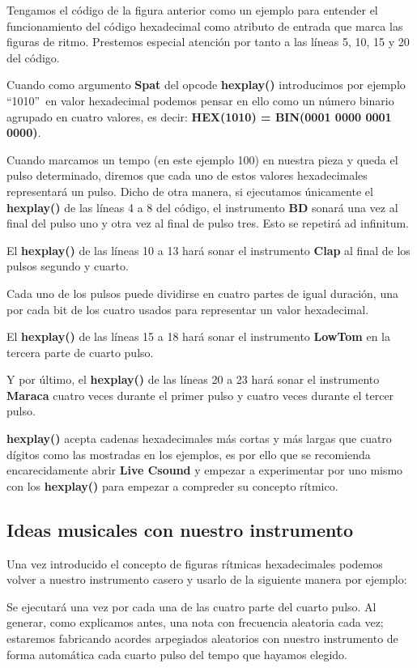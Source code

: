 Tengamos el código de la figura anterior como un ejemplo para entender el funcionamiento del código hexadecimal como atributo de entrada que marca las figuras de ritmo. Prestemos especial atención por tanto a las líneas 5, 10, 15 y 20 del código.

Cuando como argumento \textbf{Spat} del opcode \textbf{hexplay()} introducimos por ejemplo ``1010''\ en valor hexadecimal podemos pensar en ello como un número binario agrupado en cuatro valores, es decir: \textbf{HEX(1010) = BIN(0001 0000 0001 0000)}. 

Cuando marcamos un tempo (en este ejemplo 100) en nuestra pieza y queda el pulso determinado, diremos que cada uno de estos valores hexadecimales representará un pulso. Dicho de otra manera, si ejecutamos únicamente el \textbf{hexplay()} de las líneas 4 a 8 del código, el instrumento \textbf{BD} sonará una vez al final del pulso uno y otra vez al final de pulso tres. Esto se repetirá ad infinitum.

El \textbf{hexplay()} de las líneas 10 a 13 hará sonar el instrumento \textbf{Clap} al final de los pulsos segundo y cuarto.

Cada uno de los pulsos puede dividirse en cuatro partes de igual duración, una por cada bit de los cuatro usados para representar un valor hexadecimal.

El \textbf{hexplay()} de las líneas 15 a 18 hará sonar el instrumento \textbf{LowTom} en la tercera parte de cuarto pulso.

Y por último, el \textbf{hexplay()} de las líneas 20 a 23 hará sonar el instrumento \textbf{Maraca} cuatro veces durante el primer pulso y cuatro veces durante el tercer pulso.

\textbf{hexplay()} acepta cadenas hexadecimales más cortas y más largas que cuatro dígitos como las mostradas en los ejemplos, es por ello que se recomienda encarecidamente abrir \textbf{Live Csound} y empezar a experimentar por uno mismo con los \textbf{hexplay()} para empezar a compreder su concepto rítmico.
\pagebreak
\subsection{Ideas musicales con nuestro instrumento}

Una vez introducido el concepto de figuras rítmicas hexadecimales podemos volver a nuestro instrumento casero y usarlo de la siguiente manera por ejemplo:


Se ejecutará una vez por cada una de las cuatro parte del cuarto pulso. Al generar, como explicamos antes, una nota con frecuencia aleatoria cada vez; estaremos fabricando acordes arpegiados aleatorios con nuestro instrumento de forma automática cada cuarto pulso del tempo que hayamos elegido.

 

